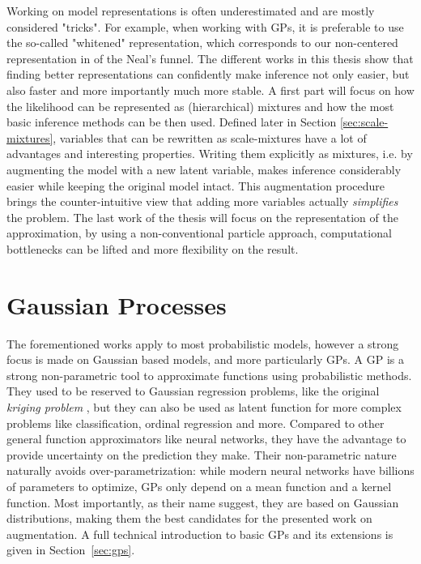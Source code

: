 Working on model representations is often underestimated and are mostly considered "tricks".
For example, when working with \acf{GPs}, it is preferable to use the so-called "whitened" representation, which corresponds to our non-centered representation in of the Neal's funnel.
The different works in this thesis show that finding better representations can confidently make inference not only easier, but also faster and more importantly much more stable. 
A first part will focus on how the likelihood can be represented as (hierarchical) mixtures and how the most basic inference methods can be then used.
Defined later in Section \ref{sec:scale-mixtures}, variables that can be rewritten as scale-mixtures have a lot of advantages and interesting properties.
Writing them explicitly as mixtures, i.e. by augmenting the model with a new latent variable, makes inference considerably easier while keeping the original model intact.
This augmentation procedure brings the counter-intuitive view that adding more variables actually \textit{simplifies} the problem.
The last work of the thesis will focus on the representation of the approximation, by using a non-conventional particle approach, computational bottlenecks can be lifted and more flexibility on the result. 


\section{Gaussian Processes}

The forementioned works apply to most probabilistic models, however a strong focus is made on Gaussian based models, and more particularly \acf{GPs}.
A \ac{GP} is a strong non-parametric tool to approximate functions using probabilistic methods.
They used to be reserved to Gaussian regression problems, like the original \textit{kriging problem} \cite{cressie1990origins}, but they can also be used as latent function for more complex problems like classification, ordinal regression and more.
Compared to other general function approximators like neural networks, they have the advantage to provide uncertainty on the prediction they make.
Their non-parametric nature naturally avoids over-parametrization: while modern neural networks have billions of parameters to optimize, \ac{GPs} only depend on a mean function and a kernel function.
Most importantly, as their name suggest, they are based on Gaussian distributions, making them the best candidates for the presented work on augmentation.
A full technical introduction to basic \ac{GPs} and its extensions is given in Section~\ref{sec:gps}.


